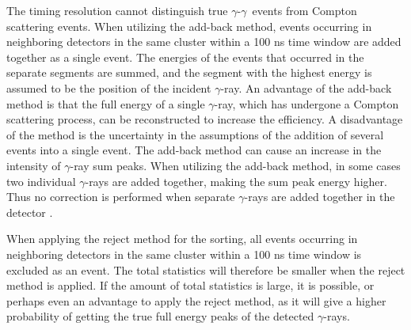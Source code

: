 \documentclass[twoside,english]{uiofysmaster/uiofysmaster}
\newcommand{\ga}{$\gamma$}
\begin{document}
The timing resolution cannot distinguish true \ga-\ga\ events from Compton scattering events.
When utilizing the add-back method, events occurring in neighboring detectors in the same cluster within a 100 ns time window are added together as a single event. 
The energies of the events that occurred in the separate segments are summed, and the segment with the highest energy is assumed to be the position of the incident \ga-ray.
An advantage of the add-back method is that the full energy of a single \ga-ray, which has undergone a Compton scattering process, can be reconstructed to increase the efficiency.
A disadvantage of the method is the uncertainty in the assumptions of the addition of several events into a single event. 
The add-back method can cause an increase in the intensity of \ga-ray sum peaks.
When utilizing the add-back method, in some cases two individual \ga-rays are added together, making the sum peak energy higher.
Thus no correction is performed when separate \ga-rays are added together in the detector \cite{Gaffney, MB-spect}.

When applying the reject method for the sorting, all events occurring in neighboring detectors in the same cluster within a 100 ns time window is excluded as an event. 
The total statistics will therefore be smaller when the reject method is applied. 
If the amount of total statistics is large, it is possible, or perhaps even an advantage to apply the reject method, as it will give a higher probability of getting the true full energy peaks of the detected \ga-rays. 
\end{document}
